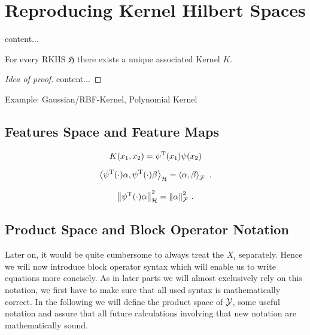 \section{Reproducing Kernel Hilbert Spaces}

\begin{definition}[RKHS]
	\label{def:rkhs}
	content...
\end{definition}

\begin{definition}[Kernel]
	\label{def:kernel}
\end{definition}

\begin{theorem}
	\label{theo:kernel-for-rkhs}
	For every RKHS $\mathfrak{H}$ there exists a unique associated Kernel $K$.
\end{theorem}
\begin{proof}[Idea of proof]
	content...
\end{proof}

Example: Gaussian/RBF-Kernel, Polynomial Kernel

\subsection{Features Space and Feature Maps}

\begin{equation}
	\label{eq:kernel-feature-map}
	K(x_1, x_2) = \psi^{\mathrm{T}}(x_1)\psi(x_2)
\end{equation}

\begin{theorem}
	\begin{equation}
		\left< \psi^{\mathrm{T}}(\cdot) \alpha, \psi^{\mathrm{T}}(\cdot) \beta\right>_\mathcal{H} = \left< \alpha, \beta\right>_\mathcal{F} \ .
	\end{equation}
\end{theorem}
\begin{corollary}
	\label{cor:feature-space-norm}
	\begin{equation}
		\norm{\psi^{\mathrm{T}}(\cdot)\alpha}_\mathcal{H}^2 = \norm{\alpha}_\mathcal{F}^2 \ .
	\end{equation}
\end{corollary}

\subsection{Product Space and Block Operator Notation}
Later on, it would be quite cumbersome to always treat the $X_i$ separately.
Hence we will now introduce block operator syntax which will enable us to write equations more concisely.
As in later parts we will almost exclusively rely on this notation, we first have to make sure that all used syntax is mathematically correct.
In the following we will define the product space of $\mathcal{Y}$, some useful notation and assure that all future calculations involving that new notation are mathematically sound.

